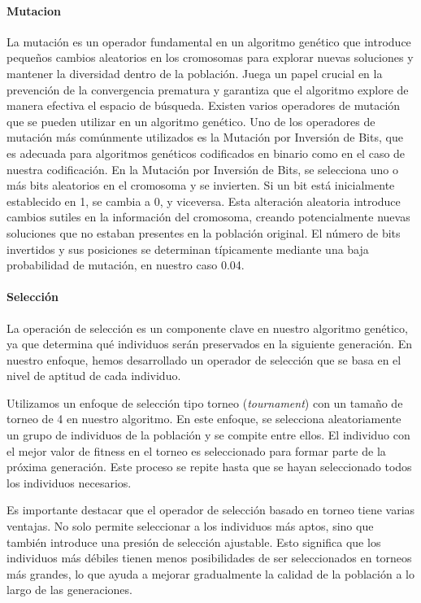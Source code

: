 \paragraph{Mutacion}

La mutación es un operador fundamental en un algoritmo genético que introduce pequeños cambios aleatorios en los cromosomas para explorar nuevas soluciones y mantener la diversidad dentro de la población. Juega un papel crucial en la prevención de la convergencia prematura y garantiza que el algoritmo explore de manera efectiva el espacio de búsqueda. Existen varios operadores de mutación que se pueden utilizar en un algoritmo genético. Uno de los operadores de mutación más comúnmente utilizados es la Mutación por Inversión de Bits, que es adecuada para algoritmos genéticos codificados en binario como en el caso de nuestra codificación.
En la Mutación por Inversión de Bits, se selecciona uno o más bits aleatorios en el cromosoma y se invierten. Si un bit está inicialmente establecido en 1, se cambia a 0, y viceversa. Esta alteración aleatoria introduce cambios sutiles en la información del cromosoma, creando potencialmente nuevas soluciones que no estaban presentes en la población original. El número de bits invertidos y sus posiciones se determinan típicamente mediante una baja probabilidad de mutación, en nuestro caso 0.04.


\paragraph{Selección}
La operación de selección es un componente clave en nuestro algoritmo genético, ya que determina qué individuos serán preservados en la siguiente generación. En nuestro enfoque, hemos desarrollado un operador de selección que se basa en el nivel de aptitud de cada individuo.

Utilizamos un enfoque de selección tipo torneo (\emph{tournament}) con un tamaño de torneo de 4 en nuestro algoritmo. En este enfoque, se selecciona aleatoriamente un grupo de individuos de la población y se compite entre ellos. El individuo con el mejor valor de fitness en el torneo es seleccionado para formar parte de la próxima generación. Este proceso se repite hasta que se hayan seleccionado todos los individuos necesarios.

Es importante destacar que el operador de selección basado en torneo tiene varias ventajas. No solo permite seleccionar a los individuos más aptos, sino que también introduce una presión de selección ajustable. Esto significa que los individuos más débiles tienen menos posibilidades de ser seleccionados en torneos más grandes, lo que ayuda a mejorar gradualmente la calidad de la población a lo largo de las generaciones.

